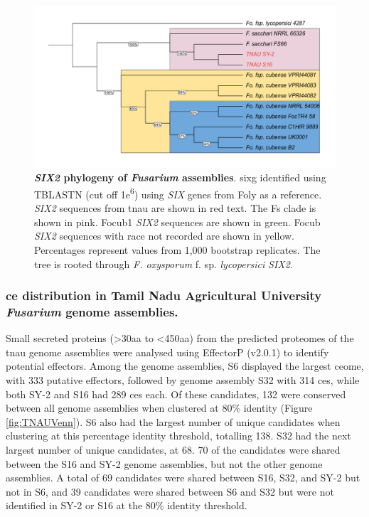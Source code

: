 \begin{figure}[htp!]
  \centering
  \includegraphics[width=15cm]{Figures/FusSIX2.Phylo.edited.pdf}
  \caption[\textit{SIX2} phylogeny of \textit{Fusarium} assemblies]{\textbf{\textit{SIX2} phylogeny of \textit{Fusarium} assemblies}. \acl{sixg} identified using TBLASTN (cut off 1\-e\textsuperscript{6}) using \textit{SIX} genes from \acl{Foly} as a reference. \textit{SIX2} sequences from \ac{tnau} are shown in red text. The \acl{Fs} clade is shown in pink. \Acl{Focub1} \textit{SIX2} sequences are shown in green. \acl{Focub} \textit{SIX2} sequences with race not recorded are shown in yellow. Percentages represent values from 1,000 bootstrap replicates. The tree is rooted through \textit{F. oxysporum} f. sp. \textit{lycopersici} \textit{SIX2}.}
  \label{fig:FusSIX2}
\end{figure}

\subsubsection{\ac{ce} distribution in Tamil Nadu Agricultural University \textit{Fusarium} genome assemblies.}
\label{tnauCEs}

Small secreted proteins (>30aa to <450aa)  from the predicted proteomes of the \ac{tnau} genome assemblies were analysed using EffectorP (v2.0.1) to identify potential effectors. Among the genome assemblies, S6 displayed the largest \acl{ce}ome, with 333 putative effectors, followed by genome assembly S32 with 314 \acp{ce}, while both SY-2 and S16 had 289 \acp{ce} each. Of these candidates, 132 were conserved between all genome assemblies when clustered at 80\% identity (Figure \ref{fig:TNAUVenn}). S6 also had the largest number of unique candidates when clustering at this percentage identity threshold, totalling 138. S32 had the next largest number of unique candidates, at 68. 70 of the candidates were shared between the S16 and SY-2 genome assemblies, but not the other genome assemblies. A total of 69 candidates were shared between S16, S32, and SY-2 but not in S6, and 39 candidates were shared between S6 and S32 but were not identified in SY-2 or S16 at the  80\% identity threshold. 

